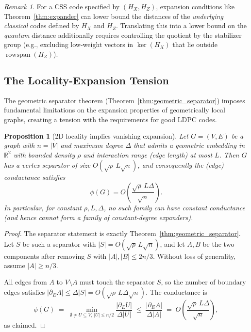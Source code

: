 \documentclass[11pt,a4paper]{article}
\newtheorem{proposition}[theorem]{Proposition}
\theoremstyle{definition}
\theoremstyle{remark}
\newtheorem{remark}[theorem]{Remark}
\begin{document}
\begin{remark}
For a CSS code specified by $(H_X,H_Z)$, expansion conditions like Theorem~\ref{thm:expander} can lower bound the distances of the \emph{underlying classical} codes defined by $H_X$ and $H_Z$. Translating this into a lower bound on the \emph{quantum} distance additionally requires controlling the quotient by the stabilizer group (e.g., excluding low-weight vectors in $\ker(H_X)$ that lie outside $\operatorname{rowspan}(H_Z)$).
\end{remark}

\subsection{The Locality-Expansion Tension}

The geometric separator theorem (Theorem~\ref{thm:geometric_separator}) imposes fundamental limitations on the expansion properties of geometrically local graphs, creating a tension with the requirements for good LDPC codes.

\begin{proposition}[2D locality implies vanishing expansion]\label{prop:local_not_expander}
Let $G=(V,E)$ be a graph with $n=|V|$ and maximum degree $\Delta$ that admits a geometric embedding in $\mathbb{R}^2$ with bounded density $\rho$ and interaction range (edge length) at most $L$. Then $G$ has a vertex separator of size $O(\sqrt{\rho}\,L\sqrt{n})$, and consequently the (edge) conductance satisfies
\[
\phi(G) = O\left(\frac{\sqrt{\rho}\,L\Delta}{\sqrt{n}}\right).
\]
In particular, for constant $\rho,L,\Delta$, no such family can have constant conductance (and hence cannot form a family of constant-degree expanders).
\end{proposition}

\begin{proof}
The separator statement is exactly Theorem~\ref{thm:geometric_separator}. Let $S$ be such a separator with $|S|=O(\sqrt{\rho}\,L\sqrt{n})$, and let $A,B$ be the two components after removing $S$ with $|A|,|B|\le 2n/3$. Without loss of generality, assume $|A|\ge n/3$.

All edges from $A$ to $V\setminus A$ must touch the separator $S$, so the number of boundary edges satisfies $|\partial_E A| \le \Delta |S| = O(\sqrt{\rho}\,L\Delta\sqrt{n})$. The conductance is
\[
\phi(G) \;=\; \min_{\emptyset\ne U\subseteq V,\,|U|\le n/2} \frac{|\partial_E U|}{\Delta |U|}
\;\le\; \frac{|\partial_E A|}{\Delta |A|}
\;=\; O\left(\frac{\sqrt{\rho}\,L\Delta}{\sqrt{n}}\right),
\]
as claimed.
\end{proof}
\end{document}
